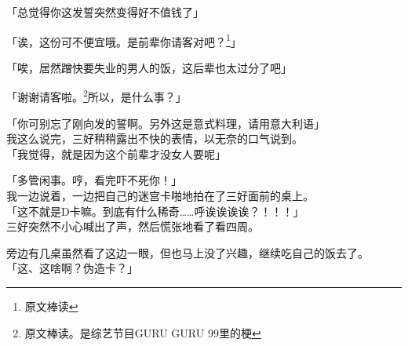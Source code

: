 「总觉得你这发誓突然变得好不值钱了」

「诶，这份可不便宜哦。是前辈你请客对吧？\footnote{原文棒读}」

「唉，居然蹭快要失业的男人的饭，这后辈也太过分了吧」

「谢谢请客啦。\footnote{原文棒读。是综艺节目GURU GURU 99里的梗}所以，是什么事？」

「你可别忘了刚向发的誓啊。另外这是意式料理，请用意大利语」\\

我这么说完，三好稍稍露出不快的表情，以无奈的口气说到。\\

「我觉得，就是因为这个前辈才没女人要呢」

「多管闲事。哼，看完吓不死你！」\\

我一边说着，一边把自己的迷宫卡啪地拍在了三好面前的桌上。\\

「这不就是D卡嘛。到底有什么稀奇……呼诶诶诶诶？！！！」\\

三好突然不小心喊出了声，然后慌张地看了看四周。

旁边有几桌虽然看了这边一眼，但也马上没了兴趣，继续吃自己的饭去了。\\

「这、这啥啊？伪造卡？」\\

